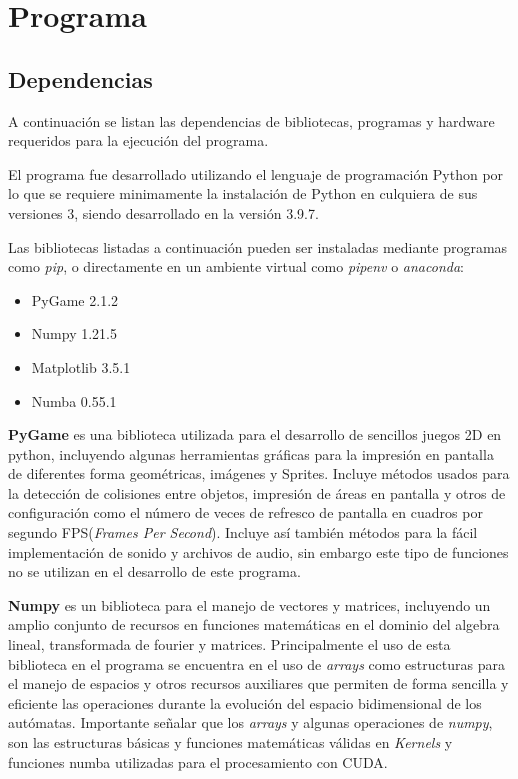 \documentclass[]{article}
\begin{document}
\newpage

\section{Programa}
	\subsection{Dependencias}
		
		A continuación se listan las dependencias de bibliotecas, programas y hardware requeridos para la ejecución del programa.
		
		El programa fue desarrollado utilizando el lenguaje de programación Python por lo que se requiere minimamente la instalación de Python en culquiera de sus versiones 3, siendo desarrollado en la versión 3.9.7.
		
		Las bibliotecas listadas a continuación pueden ser instaladas mediante programas como \textit{pip}, o directamente en un ambiente virtual como \textit{pipenv} o \textit{anaconda}:
		\begin{itemize}
			\item PyGame 2.1.2
			\item Numpy 1.21.5
			\item Matplotlib 3.5.1
			\item Numba 0.55.1
		\end{itemize}
	
		\hfill \break
		\textbf{PyGame} es una biblioteca utilizada para el desarrollo de sencillos juegos 2D en python, incluyendo algunas herramientas gráficas para la impresión en pantalla de diferentes forma geométricas, imágenes y Sprites. Incluye métodos usados para la detección de colisiones entre objetos, impresión de áreas en pantalla y otros de configuración como el número de veces de refresco de pantalla en cuadros por segundo FPS(\textit{Frames Per Second}).
		Incluye así también métodos para la fácil implementación de sonido y archivos de audio, sin embargo este tipo de funciones no se utilizan en el desarrollo de este programa.
		
		\hfill \break
		
		\textbf{Numpy} es un biblioteca para el manejo de vectores y matrices, incluyendo un amplio conjunto de recursos en funciones matemáticas en el dominio del algebra lineal, transformada de fourier y matrices.
		Principalmente el uso de esta biblioteca en el programa se encuentra en el uso de \textit{arrays} como estructuras para el manejo de espacios y otros recursos auxiliares que permiten de forma sencilla y eficiente las operaciones durante la evolución del espacio bidimensional de los autómatas.
		Importante señalar que los \textit{arrays} y algunas operaciones de \textit{numpy}, son las estructuras básicas y funciones matemáticas válidas en \textit{Kernels} y funciones numba utilizadas para el procesamiento con CUDA.
		
\end{document}
